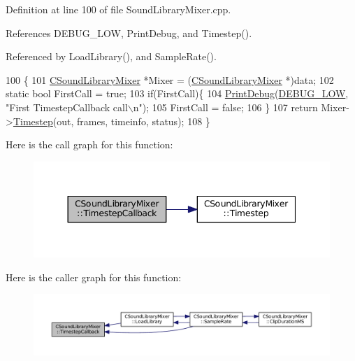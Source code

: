 Definition at line 100 of file Sound\+Library\+Mixer.\+cpp.



References D\+E\+B\+U\+G\+\_\+\+L\+OW, Print\+Debug, and Timestep().



Referenced by Load\+Library(), and Sample\+Rate().


\begin{DoxyCode}
100                                                                                                            
                                                                      \{
101     \hyperlink{classCSoundLibraryMixer}{CSoundLibraryMixer} *Mixer = (\hyperlink{classCSoundLibraryMixer}{CSoundLibraryMixer} *)data;
102 \textcolor{keyword}{static} \textcolor{keywordtype}{bool} FirstCall = \textcolor{keyword}{true};
103 \textcolor{keywordflow}{if}(FirstCall)\{
104     \hyperlink{Debug_8h_aa5f00f5537c9760f6ae1782460748ab9}{PrintDebug}(\hyperlink{Debug_8h_a3a5f3fc09784650d8388cb854882f840}{DEBUG\_LOW}, \textcolor{stringliteral}{"First TimestepCallback call\(\backslash\)n"});
105     FirstCall = \textcolor{keyword}{false};   
106 \}
107     \textcolor{keywordflow}{return} Mixer->\hyperlink{classCSoundLibraryMixer_ad3ef0b67b77862e8c88949c3415095e7}{Timestep}(out, frames, timeinfo, status);
108 \}
\end{DoxyCode}
Here is the call graph for this function\+:\nopagebreak
\begin{figure}[H]
\begin{center}
\leavevmode
\includegraphics[width=344pt]{classCSoundLibraryMixer_a1d04553aa93769b8bff4bb5c8b7bdfa1_cgraph}
\end{center}
\end{figure}
Here is the caller graph for this function\+:\nopagebreak
\begin{figure}[H]
\begin{center}
\leavevmode
\includegraphics[width=350pt]{classCSoundLibraryMixer_a1d04553aa93769b8bff4bb5c8b7bdfa1_icgraph}
\end{center}
\end{figure}


